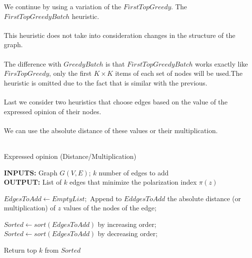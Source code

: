 \vspace{10pt}
\clearpage
\noindent We continue by using a variation of the $FirstTopGreedy$.  The $FirstTopGreedyBatch$ heuristic.
\\
\\
This heuristic does not take into consideration changes in the structure of the graph.
\\
\\
The difference with $GreedyBatch$ is that $FirstTopGreedyBatch$ works exactly like $FirsTopGreedy$, only the first $K \times K$ items of each set of nodes will be used.The heuristic is omitted due to the fact that is similar with the previous.
\\
\\
Last we consider two heuristics that choose edges based on the value of the expressed opinion of their nodes.
\\
\\
We can use the absolute distance of these values or their multiplication.
\\
\\
\begin{algorithm}[H]
	\caption{Expressed opinion (Distance/Multiplication)}
	\label{alg:expreDisMiss}
	
	\begin{flushleft}
        		\textbf{INPUTS:} Graph $G(V, E)$; $k$ number of edges to add\\
		\vspace{6pt}
        		\textbf{OUTPUT:} List of $k$ edges that minimize the polarization index $\pi(z)$
	\end{flushleft}
	
	\begin{algorithmic}[1]
		\STATE $EdgesToAdd \leftarrow Empty List;$
			\STATE Append to $EddgesToAdd$ the absolute distance (or multiplication) of $z$ values of the nodes of the edge;
		\ENDFOR
		
			\STATE $Sorted \leftarrow sort(EdgesToAdd)$ by increasing order;
		\ELSE 
			\STATE $Sorted \leftarrow sort(EdgesToAdd)$ by decreasing order;
		\ENDIF

		\STATE Return top $k$ from $Sorted$
	\end{algorithmic}
	
\end{algorithm}

\clearpage



